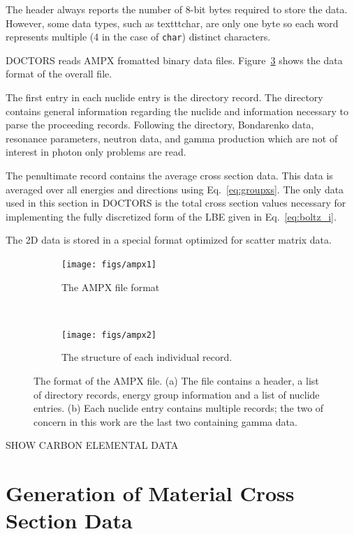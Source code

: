The header always reports the number of 8-bit bytes required to store the data. However, some data types, such as texttt{char}, are only one byte so each word represents multiple (4 in the case of \texttt{char}) distinct characters.

DOCTORS reads AMPX fromatted binary data files. Figure~\ref{fig:ampx} shows the data format of the overall file. 

The first entry in each nuclide entry is the directory record. The directory contains general information regarding the nuclide and information necessary to parse the proceeding records. Following the directory, Bondarenko data, resonance parameters, neutron data, and gamma production which are not of interest in photon only problems are read.

The penultimate record contains the average cross section data. This data is averaged over all energies and directions using Eq.~\ref{eq:groupxs}. The only data used in this section in DOCTORS is the total cross section values necessary for implementing the fully discretized form of the LBE given in Eq.~\ref{eq:boltz_i}.

The 2D data is stored in a special format optimized for scatter matrix data.

\begin{figure}
    \centering
    \begin{subfigure}[b]{0.45\textwidth}
        \texttt{[image: figs/ampx1]}
        \caption{The AMPX file format}
        \label{fig:ampx1}
    \end{subfigure}
    ~
    \begin{subfigure}[b]{0.45\textwidth}
        \texttt{[image: figs/ampx2]}
        \caption{The structure of each individual record.}
        \label{fig:ampx2}
    \end{subfigure}
    \caption{The format of the AMPX file. (a) The file contains a header, a list of directory records, energy group information and a list of nuclide entries. (b) Each nuclide entry contains multiple records; the two of concern in this work are the last two containing gamma data.}\label{fig:ampx}
\end{figure}

SHOW CARBON ELEMENTAL DATA

\section{Generation of Material Cross Section Data}\label{sec:xsgen}

